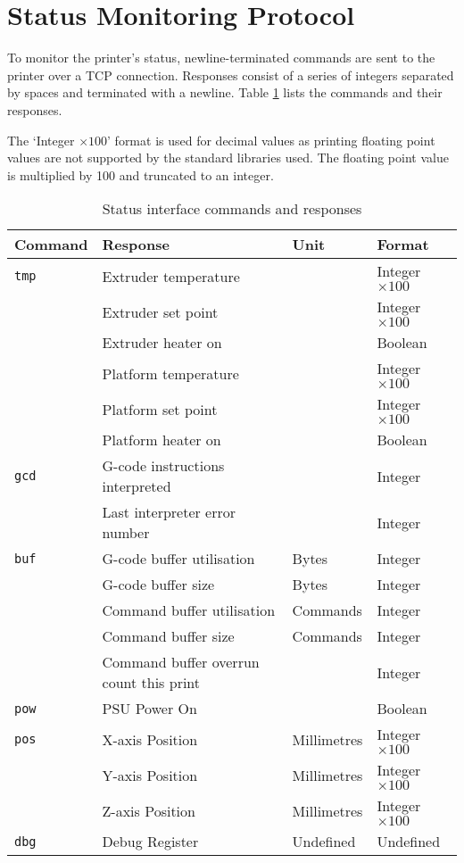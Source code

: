 	\section{Status Monitoring Protocol}
		
		\label{sec:statusSpec}
		
		To monitor the printer's status, newline-terminated commands are sent to the
		printer over a TCP connection. Responses consist of a series of integers
		separated by spaces and terminated with a newline. Table
		\ref{tab:statuscmds} lists the commands and their responses.
		
		The `Integer $\times100$' format is used for decimal values as printing
		floating point values are not supported by the standard libraries used. The
		floating point value is multiplied by 100 and truncated to an integer.
		
		\begin{table}
			\centering
			\begin{tabular}{l l l l}
				\toprule
				Command & Response & Unit & Format \\
				\midrule
				\verb|tmp| & Extruder temperature & \dC & Integer $\times100$ \\
				           & Extruder set point   & \dC & Integer $\times100$ \\
				           & Extruder heater on   &     & Boolean \\
				           & Platform temperature & \dC & Integer $\times100$ \\
				           & Platform set point   & \dC & Integer $\times100$ \\
				           & Platform heater on   &     & Boolean \\
				\addlinespace
				\verb|gcd| & G-code instructions interpreted & & Integer \\
				           & Last interpreter error number &  & Integer \\
				\addlinespace
				\verb|buf| & G-code buffer utilisation & Bytes & Integer \\
				           & G-code buffer size & Bytes & Integer \\
				           & Command buffer utilisation & Commands & Integer \\
				           & Command buffer size & Commands & Integer \\
				           & Command buffer overrun count this print & & Integer \\
				\addlinespace
				\verb|pow| & PSU Power On & & Boolean \\
				\addlinespace
				\verb|pos| & X-axis Position & Millimetres & Integer $\times100$ \\
				           & Y-axis Position & Millimetres & Integer $\times100$ \\
				           & Z-axis Position & Millimetres & Integer $\times100$ \\
				\addlinespace
				\verb|dbg| & Debug Register & Undefined & Undefined \\
				\bottomrule
			\end{tabular}
			
			\caption{Status interface commands and responses}
			\label{tab:statuscmds}
		\end{table}
